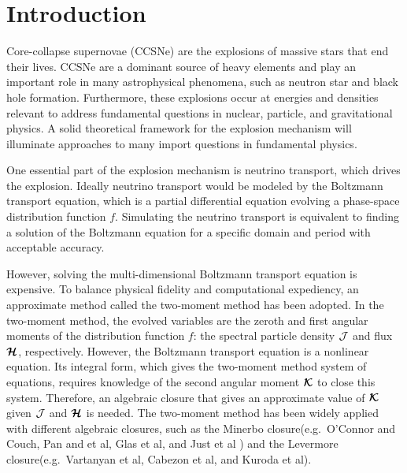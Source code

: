 \section{Introduction}

Core-collapse supernovae (CCSNe) are the explosions of massive stars that end their lives.
CCSNe are a dominant source of heavy elements and play an important role in many astrophysical phenomena, such as neutron star and black hole formation.  
Furthermore, these explosions occur at energies and densities relevant to address fundamental questions in nuclear, particle, and gravitational physics. 
A solid theoretical framework for the explosion mechanism will illuminate approaches to many import questions in fundamental physics.

One essential part of the explosion mechanism is neutrino transport, which drives the explosion.  
Ideally neutrino transport would be modeled by the Boltzmann transport equation, which is a partial differential equation evolving a phase-space distribution function $f$.
Simulating the neutrino transport is equivalent to finding a solution of the Boltzmann equation for a specific domain and period with acceptable accuracy.

However, solving the multi-dimensional Boltzmann transport equation is expensive.
To balance physical fidelity and computational expediency, an approximate method called the two-moment method has been adopted.
In the two-moment method, the evolved variables are the zeroth and first angular moments of the distribution function $f$: the spectral particle density $\mathcal{J}$ and flux $\boldsymbol{\mathcal{H}}$, respectively.
However, the Boltzmann transport equation is a nonlinear equation.
Its integral form, which gives the two-moment method system of equations, requires knowledge of the second angular moment $\boldsymbol{\mathcal{K}}$ to close this system.
Therefore, an algebraic closure that gives an approximate value of $\boldsymbol{\mathcal{K}}$ given $\mathcal{J}$ and $\boldsymbol{\mathcal{H}}$ is needed.
The two-moment method has been widely applied with different algebraic closures, such as the Minerbo\cite{minerbo_1978} closure(e.g.~{O'Connor} and {Couch}\cite{oConnorCouch_2018}, Pan and et al\cite{pan_etal_2018}, Glas et al\cite{glas_etal_2018}, and Just et al\cite{just_etal_2018} ) and the Levermore\cite{levermore_1984} closure(e.g.~Vartanyan et al\cite{vartanyan_etal_2018}, Cabezon et al\cite{cabezon_etal_2018}, and Kuroda et al\cite{kuroda_etal_2016}). 

